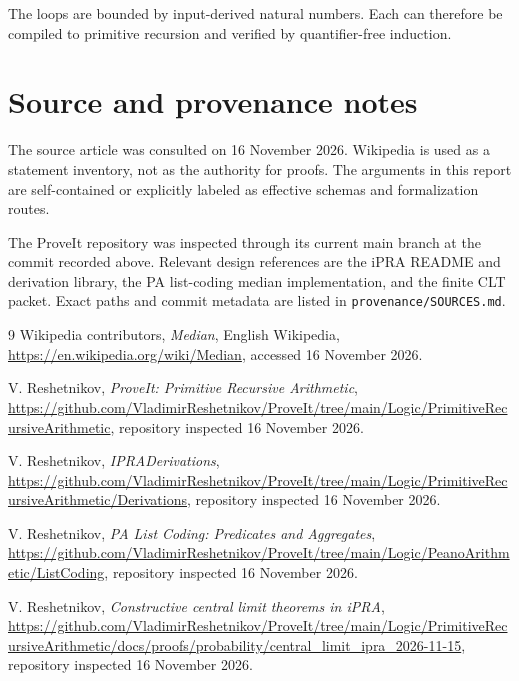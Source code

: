 \documentclass[11pt]{article}
\begin{document}
The loops are bounded by input-derived natural numbers.  Each can therefore be
compiled to primitive recursion and verified by quantifier-free induction.

\section{Source and provenance notes}

The source article was consulted on 16 November 2026.  Wikipedia is used as a
statement inventory, not as the authority for proofs.  The arguments in this
report are self-contained or explicitly labeled as effective schemas and
formalization routes.

The ProveIt repository was inspected through its current main branch at the
commit recorded above.  Relevant design references are the iPRA README and
derivation library, the PA list-coding median implementation, and the finite
CLT packet.  Exact paths and commit metadata are listed in
\texttt{provenance/SOURCES.md}.

\begin{thebibliography}{9}
Wikipedia contributors, \emph{Median}, English Wikipedia,
\url{https://en.wikipedia.org/wiki/Median}, accessed 16 November 2026.

V. Reshetnikov, \emph{ProveIt: Primitive Recursive Arithmetic},
\url{https://github.com/VladimirReshetnikov/ProveIt/tree/main/Logic/PrimitiveRecursiveArithmetic},
repository inspected 16 November 2026.

V. Reshetnikov, \emph{IPRADerivations},
\url{https://github.com/VladimirReshetnikov/ProveIt/tree/main/Logic/PrimitiveRecursiveArithmetic/Derivations},
repository inspected 16 November 2026.

V. Reshetnikov, \emph{PA List Coding: Predicates and Aggregates},
\url{https://github.com/VladimirReshetnikov/ProveIt/tree/main/Logic/PeanoArithmetic/ListCoding},
repository inspected 16 November 2026.

V. Reshetnikov, \emph{Constructive central limit theorems in iPRA},
\url{https://github.com/VladimirReshetnikov/ProveIt/tree/main/Logic/PrimitiveRecursiveArithmetic/docs/proofs/probability/central_limit_ipra_2026-11-15},
repository inspected 16 November 2026.
\end{thebibliography}
\end{document}
